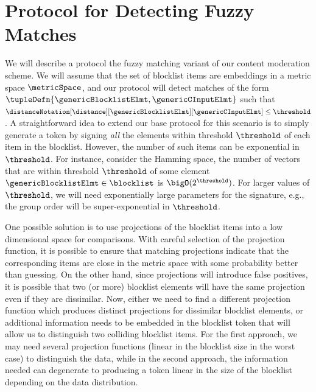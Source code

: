 \section{Protocol for Detecting Fuzzy Matches}
%
We will describe a protocol the fuzzy matching variant of our content moderation scheme. 
We will assume that the set of blocklist items are embeddings in a metric space $\metricSpace $, and our protocol will detect 
matches of the form $\tupleDefn{\genericBlocklistElmt, \genericCInputElmt}$ such that 
$\distanceNotation[\distance][\genericBlocklistElmt][\genericCInputElmt] \le \threshold$. 
A straightforward idea to extend our base protocol for this scenario is to simply generate a token by 
signing \textit{all} the elements within threshold $\threshold$ of each item in the blocklist. 
However, the number of such items can be 
exponential in $\threshold$. For instance, consider the Hamming space, the number of vectors that 
are within threshold $\threshold$ of some element $\genericBlocklistElmt \in \blocklist$ is 
$\bigO(2^{\threshold})$. For larger values of $\threshold$, we will need exponentially large 
parameters for the signature, e.g., the group order will be super-exponential in 
$\threshold$. 


One possible solution is to use projections of the blocklist items into a low dimensional space for 
comparisons. With careful selection of the projection function, it is possible to 
ensure that matching projections indicate that the corresponding items are close in the metric space 
with some probability better than guessing. On the other hand, since 
projections will introduce false positives, it is possible that two (or more) blocklist elements will 
have the same projection even if they are dissimilar. Now, either we need to find a different 
projection function which produces distinct projections for dissimilar blocklist elements, or 
additional  information needs to be embedded in the blocklist token that will allow us to distinguish 
two colliding blocklist items. For the first approach, we may need several projection functions (linear 
in the blocklist size in the worst case) to distinguish the data, 
while  in the second approach, the information needed can
degenerate to producing a token linear in the size of the blocklist depending on the data 
distribution. 




